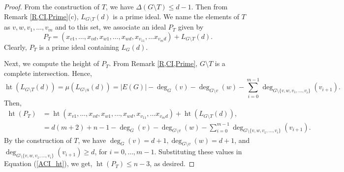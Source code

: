 \documentclass[11pt,a4paper,reqno]{amsart}
\theoremstyle{definition}
\newtheorem{remark}[thm]{Remark}
\numberwithin{equation}{section}
\DeclareMathOperator{\het}{ht}
\begin{document}
\begin{proof}
     
     From the construction of $T$, we have $\Delta(G\setminus T) \leq d-1$. Then from Remark \ref{R,CI,Prime}(c), $L_{G\setminus T}(d)$ is a prime ideal. We name the elements of $T$ as $v,w, v_1, \ldots, v_m$ and to this set, we associate an ideal $P_T$ given by 
     $$P_T=(x_{v1},\ldots, x_{vd},x_{w1},\ldots, x_{wd}, x_{v_11},\ldots x_{v_md})+L_{G\setminus T}(d).$$ Clearly, $P_T$ is a prime ideal containing $L_G(d)$. 
    
    Next, we compute the height of $P_T$. 
    From Remark \ref{R,CI,Prime}, $G \setminus T$ is a complete intersection. Hence,  
    $$\het(L_{G\setminus T}(d))=\mu(L_{G \setminus u}(d)) = |E(G)| - \deg_G(v)- \deg_{G\setminus v}(w) -\sum_{i=0}^{m-1}\deg_{G\setminus \{v,w,v_1,\ldots,v_i\}}(v_{i+1}).$$
    Then, 
    \begin{equation} \label{ACI_ht}
    \begin{split}
        \het(P_T) & = \het(x_{v1},\ldots, x_{vd},x_{w1},\ldots, x_{wd}, x_{v_11},\ldots x_{v_md}) + \het(L_{G\setminus T}(d)), \\
        & = d(m+2) + n-1 - \deg_G(v)-\deg_{G\setminus v}(w)-\sum_{i=0}^{m-1}\deg_{G\setminus \{v,w,v_1,\ldots,v_i\}}(v_{i+1}).
    \end{split} 
    \end{equation}
    By the construction of $T$, we have $\deg_{G}(v) = d+1, \deg_{G\setminus v}(w) = d+1$, and  $\deg_{G\setminus \{v,w,v_1,\ldots,v_i\}}(v_{i+1}) \geq d$, for $i={0,\ldots,m-1}$. Substituting these values in Equation (\ref{ACI_ht}), we get, $\het(P_T) \leq n-3$, as desired.
\end{proof}



    
\end{document}
